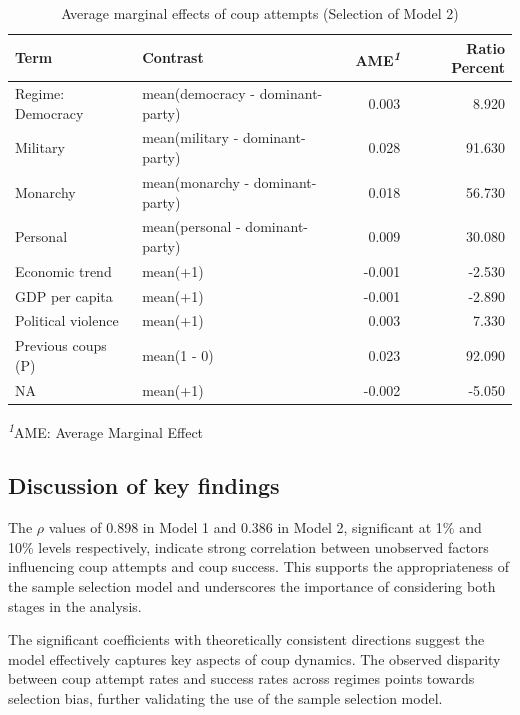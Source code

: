 \documentclass[
  12pt,
]{report}
\begin{document}
\begin{longtable}{@{\extracolsep{\fill}}llrr}

\caption{\label{tbl-mfx2}Average marginal effects of coup attempts
(Selection of Model 2)}

\tabularnewline

\toprule
Term & Contrast & AME\textsuperscript{\textit{1}} & Ratio Percent \\ 
\midrule\addlinespace[2.5pt]
Regime: Democracy & mean(democracy - dominant-party) & 0.003 & 8.920 \\ 
{\hspace{47.25pt}Military} & mean(military - dominant-party) & 0.028 & 91.630 \\ 
{\hspace{47.25pt}Monarchy} & mean(monarchy - dominant-party) & 0.018 & 56.730 \\ 
{\hspace{47.25pt}Personal} & mean(personal - dominant-party) & 0.009 & 30.080 \\ 
Economic trend & mean(+1) & -0.001 & -2.530 \\ 
GDP per capita & mean(+1) & -0.001 & -2.890 \\ 
Political violence & mean(+1) & 0.003 & 7.330 \\ 
Previous coups (P) & mean(1 - 0) & 0.023 & 92.090 \\ 
NA & mean(+1) & -0.002 & -5.050 \\ 
\bottomrule

\end{longtable}

\begin{minipage}{\linewidth}
\textsuperscript{\textit{1}}AME: Average Marginal Effect\\
\end{minipage}
\endgroup

\subsection{Discussion of key
findings}\label{discussion-of-key-findings}

The \(\rho\) values of 0.898 in Model 1 and 0.386 in Model 2,
significant at 1\% and 10\% levels respectively, indicate strong
correlation between unobserved factors influencing coup attempts and
coup success. This supports the appropriateness of the sample selection
model and underscores the importance of considering both stages in the
analysis.

The significant coefficients with theoretically consistent directions
suggest the model effectively captures key aspects of coup dynamics. The
observed disparity between coup attempt rates and success rates across
regimes points towards selection bias, further validating the use of the
sample selection model.
\end{document}
